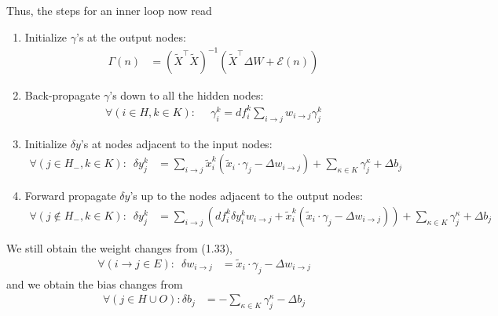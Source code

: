\documentclass[12pt]{article}
\renewcommand{\ij}{i \rightarrow j}
\begin{document}
Thus, the steps for an inner loop now read
\begin{enumerate}
\item
Initialize $\gamma$'s at the output nodes:
\begin{align}
\Gamma(n) & = (\tilde{X}^\top \tilde{X})^{-1} (\tilde{X}^\top \Delta W + \mathcal{E}(n)) \tag{17}
\end{align}

\item
Back-propagate $\gamma$'s down to all the hidden nodes:
\begin{align}
\forall (i \in H, k \in K): & \,\,\, \gamma_i^k = df_i^k \sum_{i \rightarrow j} w_{i \rightarrow j} \gamma_j^k \tag{4}
\end{align}

\item
Initialize $\delta y$'s at nodes adjacent to the input nodes:
\begin{align}
\forall (j \in H_-, k \in K): \,\,\, \delta y_j^k
& = \sum_{\ij} \tilde{x}_i^k (\tilde{x}_i \cdot \gamma_j - \Delta w_{\ij})
+ \sum_{\kappa \in K} \gamma_j^\kappa + \Delta b_j \tag{9}
\end{align}

\item
Forward propagate $\delta y$'s up to the nodes adjacent to the output nodes:
\begin{align}
\forall (j \not\in H_-, k \in K): \,\,\, \delta y_j^k & = 
\sum_{\ij} (df_i^k \delta y_i^k w_{\ij} + \tilde{x}_i^k (\tilde{x}_i \cdot \gamma_j - \Delta w_{\ij}) ) 
+ \sum_{\kappa \in K} \gamma_j^\kappa + \Delta b_j \tag{11}
\end{align}

\end{enumerate}
We still obtain the weight changes from (1.33),
\begin{align}
\forall (\ij \in E): \,\,\, \delta w_{\ij} & = \tilde{x}_i \cdot \gamma_j - \Delta w_{\ij}
\end{align}
and we obtain the bias changes from
\begin{align}
\forall (j \in H \cup O) : \delta b_j & = -\sum_{\kappa \in K} \gamma_j^\kappa - \Delta b_j
\end{align}




{}

\end{document}
